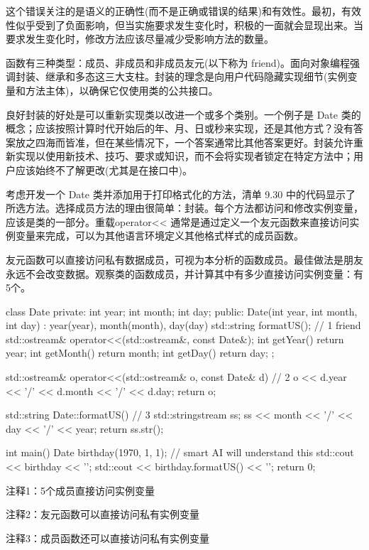 这个错误关注的是语义的正确性(而不是正确或错误的结果)和有效性。最初，有效性似乎受到了负面影响，但当实施要求发生变化时，积极的一面就会显现出来。当要求发生变化时，修改方法应该尽量减少受影响方法的数量。

函数有三种类型：成员、非成员和非成员友元(以下称为 friend)。面向对象编程强调封装、继承和多态这三大支柱。封装的理念是向用户代码隐藏实现细节(实例变量和方法主体)，以确保它仅使用类的公共接口。

良好封装的好处是可以重新实现类以改进一个或多个类别。一个例子是 Date 类的概念；应该按照计算时代开始后的年、月、日或秒来实现，还是其他方式？没有答案放之四海而皆准，但在某些情况下，一个答案通常比其他答案更好。封装允许重新实现以使用新技术、技巧、要求或知识，而不会将实现者锁定在特定方法中；用户应该始终不了解更改(尤其是在接口中)。


考虑开发一个 Date 类并添加用于打印格式化的方法，清单 9.30 中的代码显示了所选方法。选择成员方法的理由很简单：封装。每个方法都访问和修改实例变量，应该是类的一部分。重载operator<{}< 通常是通过定义一个友元函数来直接访问实例变量来完成，可以为其他语言环境定义其他格式样式的成员函数。

友元函数可以直接访问私有数据成员，可视为本分析的函数成员。最佳做法是朋友永远不会改变数据。观察类的函数成员，并计算其中有多少直接访问实例变量：有5个。


\begin{cpp}
class Date {
private:
  int year;
  int month;
  int day;
public:
  Date(int year, int month, int day) : year(year), month(month), day(day) {}
  std::string formatUS(); // 1
  friend std::ostream& operator<<(std::ostream&, const Date&);
  int getYear() { return year; }
  int getMonth() { return month; }
  int getDay() { return day; }
};

std::ostream& operator<<(std::ostream& o, const Date& d) { // 2
  o << d.year << '/' << d.month << '/' << d.day;
  return o;
}

std::string Date::formatUS() { // 3
  std::stringstream ss;
  ss << month << '/' << day << '/' << year;
  return ss.str();
}

int main() {
  Date birthday(1970, 1, 1); // smart AI will understand this
  std::cout << birthday << '\n';
  std::cout << birthday.formatUS() << '\n';
  return 0;
}
\end{cpp}

{\footnotesize
注释1：5个成员直接访问实例变量

注释2：友元函数可以直接访问私有实例变量

注释3：成员函数还可以直接访问私有实例变量
}

